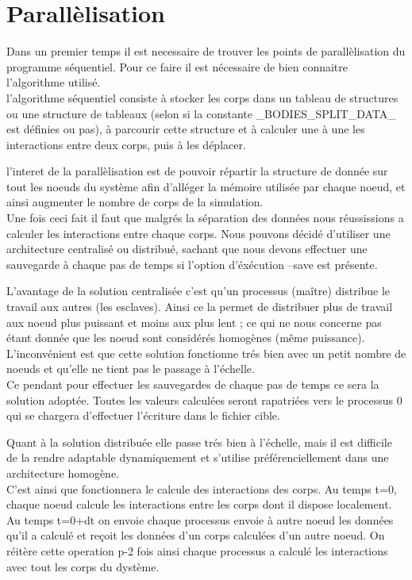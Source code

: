 \section{Parallèlisation}

\par Dans un premier temps il est necessaire de trouver les points de parallèlisation 
du programme séquentiel. Pour ce faire il est nécessaire de bien connaitre l'algorithme 
utilisé.\\
l'algorithme séquentiel consiste à stocker les corps dans un tableau de structures ou une structure 
de tableaux (selon si la constante \_BODIES\_SPLIT\_DATA\_ est définies ou pas), à parcourir 
cette structure et à calculer une à une les interactions entre deux corps, puis à les déplacer.\\

\par l'interet de la parallèlisation est de pouvoir répartir la structure de donnée sur tout les
noeuds du système afin d'alléger la mémoire utilisée par chaque noeud, et ainsi augmenter le 
nombre de corps de la simulation.\\

Une fois ceci fait il faut que malgrés la séparation des données nous réussissions a calculer
les interactions entre chaque corps. Nous pouvons décidé d'utiliser une architecture centralisé 
ou distribué, sachant que nous devons effectuer une sauvegarde à chaque pas de temps si l'option 
d'éxécution --save est présente.\\

\par L'avantage de la solution centralisée c'est qu'un processus (maître) distribue le travail aux autres
(les esclaves). Ainsi ce la permet de distribuer plus de travail aux noeud plus puissant et moins aux
plus lent ; ce qui ne nous concerne pas étant donnée que les noeud sont considérés homogènes
(même puissance).\\
L'inconvénient est que cette solution fonctionne trés bien avec un petit nombre de noeuds et qu'elle 
ne tient pas le passage à l'échelle.\\
Ce pendant pour effectuer les sauvegardes de chaque pas de temps ce sera la solution adoptée. 
Toutes les valeurs calculées seront rapatriées vers le processus 0 qui se chargera d'effectuer 
l'écriture  dans le fichier cible.\\
\par Quant à la solution distribuée elle passe trés bien à l'échelle, mais il est difficile de
la rendre adaptable dynamiquement et s'utilise préférenciellement dans une architecture homogène.
\\C'est ainsi que fonctionnera le calcule des interactions des corps. Au temps t=0, chaque noeud 
calcule les interactions entre les corps dont il dispose localement. Au temps t=0+dt on envoie chaque
processus envoie à autre noeud les données qu'il a calculé et reçoit les données d'un corps
calculées d'un autre noeud. On réitère cette operation p-2 fois ainsi chaque processus a
calculé les interactions avec tout les corps du dystème.\\

